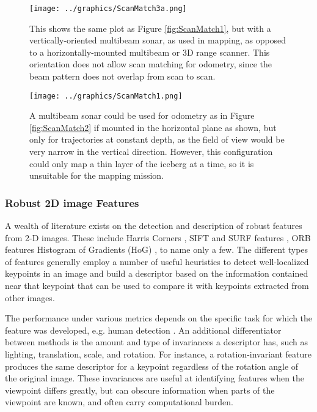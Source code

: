 \begin{figure}[h]
   \centering
   \texttt{[image: ../graphics/ScanMatch3a.png]} %
   \caption{This shows the same plot as Figure \ref{fig:ScanMatch1}, but with a vertically-oriented multibeam sonar, as used in mapping, as opposed to a horizontally-mounted multibeam or 3D range scanner. This orientation does not allow scan matching for odometry, since the beam pattern does not overlap from scan to scan.}
   \label{fig:NoMatch}
\end{figure}

\begin{figure}[h]
   \centering
   \texttt{[image: ../graphics/ScanMatch1.png]} %
   \caption{A multibeam sonar could be used for odometry as in Figure \ref{fig:ScanMatch2} if mounted in the horizontal plane as shown, but only for trajectories at constant depth, as the field of view would be very narrow in the vertical direction. However, this configuration could only map a thin layer of the iceberg at a time, so it is unsuitable for the mapping mission.}
   \label{fig:ScanMatchMultibeam}
\end{figure}
%


\subsubsection{Robust 2D image Features}
\label{sec.2Dfeatures}
A wealth of literature exists on the detection and description of robust features from 2-D images. These include Harris Corners \cite{Harris1988}, SIFT and SURF features \cite{Lowe2004} \cite{Bay2006}, ORB features \cite{Rublee2011} Histogram of Gradients (HoG) \cite{Dalal2005}, to name only a few. The different types of features generally employ a number of useful heuristics to detect well-localized keypoints in an image and build a descriptor based on the information contained near that keypoint that can be used to compare it with keypoints extracted from other images. 

The performance under various metrics depends on the specific task for which the feature was developed, e.g. human detection \cite{Dalal2005}. An additional differentiator between methods is the amount and type of invariances a descriptor has, such as lighting, translation, scale, and rotation. For instance, a rotation-invariant feature produces the same descriptor for a keypoint regardless of the rotation angle of the original image. These invariances are useful at identifying features when the viewpoint differs greatly, but can obscure information when parts of the viewpoint are known, and often carry computational burden. 

